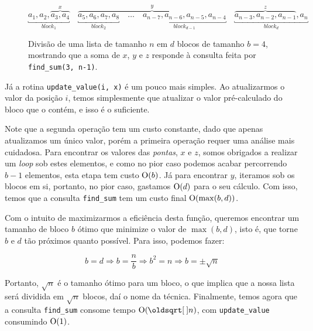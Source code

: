 \begin{figure}
    \centering
    \begin{equation*}
        \underbracket{a_1, a_2, \overbrace{a_3, a_4}^x}_{block_1} \quad
        \overbrace{
            \underbracket{a_5, a_6, a_7, a_8}_{block_2} \quad
            \dots \quad
            \underbracket{a_{n-7}, a_{n-6}, a_{n-5}, a_{n-4}}_{block_{d-1}}
        }^y \quad
        \underbracket{\overbrace{a_{n-3}, a_{n-2}, a_{n-1}}^z, a_n}_{block_d}
    \end{equation*}
    \caption{Divisão de uma lista de tamanho $n$ em $d$ blocos de tamanho $b = 4$, mostrando que a soma de $x$, $y$ e $z$ responde à consulta feita por \texttt{find\_sum(3, n-1)}.}
    \label{fig:sqrt-decomp-blocks}
\end{figure}

Já a rotina \texttt{update\_value(i, x)} é um pouco mais simples. Ao atualizarmos o valor da posição $i$, temos simplesmente que atualizar o valor pré-calculado do bloco que o contém, e isso é o suficiente.

Note que a segunda operação tem um custo constante, dado que apenas atualizamos um único valor, porém a primeira operação requer uma análise mais cuidadosa. Para encontrar os valores das \emph{pontas}, $x$ e $z$, somos obrigados a realizar um \emph{loop} sob estes elementos, e como no pior caso podemos acabar percorrendo $b-1$ elementos, esta etapa tem custo $\mathrm{O}(b)$. Já para encontrar $y$, iteramos sob os blocos em si, portanto, no pior caso, gastamos $\mathrm{O}(d)$ para o seu cálculo. Com isso, temos que a consulta \texttt{find\_sum} tem um custo final $\mathrm{O}(\max(b, d))$.

Com o intuito de maximizarmos a eficiência desta função, queremos encontrar um tamanho de bloco $b$ ótimo que minimize o valor de $\max(b, d)$, isto é, que torne $b$ e $d$ tão próximos quanto possível. Para isso, podemos fazer:

\begin{equation}
    b = d \Rightarrow
    b = \frac{n}{b} \Rightarrow
    b^2 = n \Rightarrow
    b = \pm \sqrt{n}
\end{equation}

Portanto, $\sqrt{n}$ é o tamanho ótimo para um bloco, o que implica que a nossa lista será dividida em $\sqrt{n}$ blocos, daí o nome da técnica. Finalmente, temos agora que a consulta \texttt{find\_sum} consome tempo $\Oh(\sqrt{n})$, com \texttt{update\_value} consumindo $\mathrm{O}(1)$.

